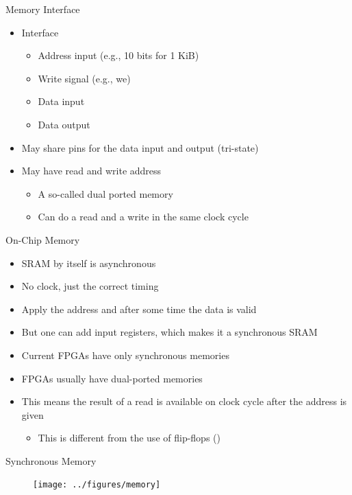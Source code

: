 \begin{frame}[fragile]{Memory Interface}
\begin{itemize}
\item Interface
\begin{itemize}
\item Address input (e.g., 10 bits for 1 KiB)
\item Write signal (e.g., we)
\item Data input
\item Data output
\end{itemize}
\item May share pins for the data input and output (tri-state)
\item May have read and write address
\begin{itemize}
\item A so-called dual ported memory
\item Can do a read and a write in the same clock cycle
\end{itemize}
\end{itemize}
\end{frame}


\begin{frame}[fragile]{On-Chip Memory}
\begin{itemize}
\item SRAM by itself is asynchronous
\item No clock, just the correct timing
\item Apply the address and after some time the data is valid
\item But one can add input registers, which makes it a synchronous SRAM
\item Current FPGAs have only synchronous memories
\item FPGAs usually have dual-ported memories
\item This means the result of a read is available on clock cycle after the address is given
\begin{itemize}
\item This is different from the use of flip-flops ()
\end{itemize}
\end{itemize}
\end{frame}

\begin{frame}[fragile]{Synchronous Memory}
\begin{figure}
  \texttt{[image: ../figures/memory]}
\end{figure}
\end{frame}

